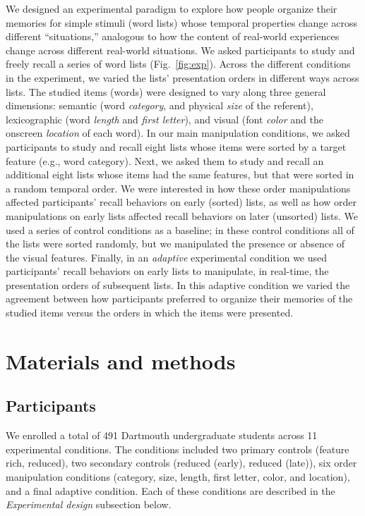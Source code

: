 \documentclass[11pt]{article}
\begin{document}
We designed an experimental paradigm to explore how people organize their
memories for simple stimuli (word lists) whose temporal properties change
across different ``situations,'' analogous to how the content of real-world
experiences change across different real-world situations. We asked
participants to study and freely recall a series of word lists
(Fig.~\ref{fig:exp}). Across the different conditions in the experiment, we
varied the lists' presentation orders in different ways across lists. The
studied items (words) were designed to vary along three general dimensions:
semantic (word \textit{category}, and physical \textit{size} of the referent),
lexicographic (word \textit{length} and \textit{first letter}), and visual
(font \textit{color} and the onscreen \textit{location} of each word). In our
main manipulation conditions, we asked participants to study and recall eight
lists whose items were sorted by a target feature (e.g., word category). Next,
we asked them to study and recall an additional eight lists whose items had the
same features, but that were sorted in a random temporal order. We were
interested in how these order manipulations affected participants' recall
behaviors on early (sorted) lists, as well as how order manipulations on early
lists affected recall behaviors on later (unsorted) lists. We used a series of
control conditions as a baseline; in these control conditions all of the lists
were sorted randomly, but we manipulated the presence or absence of the visual
features. Finally, in an \textit{adaptive} experimental condition we used
participants' recall behaviors on early lists to manipulate, in real-time, the
presentation orders of subsequent lists. In this adaptive condition we varied
the agreement between how participants preferred to organize their memories of
the studied items versus the orders in which the items were presented.

\section*{Materials and methods}

\subsection*{Participants}

We enrolled a total of 491 Dartmouth undergraduate students across 11
experimental conditions. The conditions included two primary controls (feature
rich, reduced), two secondary controls (reduced (early), reduced (late)), six
order manipulation conditions (category, size, length, first letter, color, and
location), and a final adaptive condition. Each of these conditions are
described in the \textit{Experimental design} subsection below.
\end{document}

